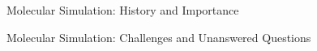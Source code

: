 \begin{section}{Molecular Simulation: History and Importance}

\end{section}
\begin{section}{Molecular Simulation: Challenges and Unanswered Questions}


\end{section}
